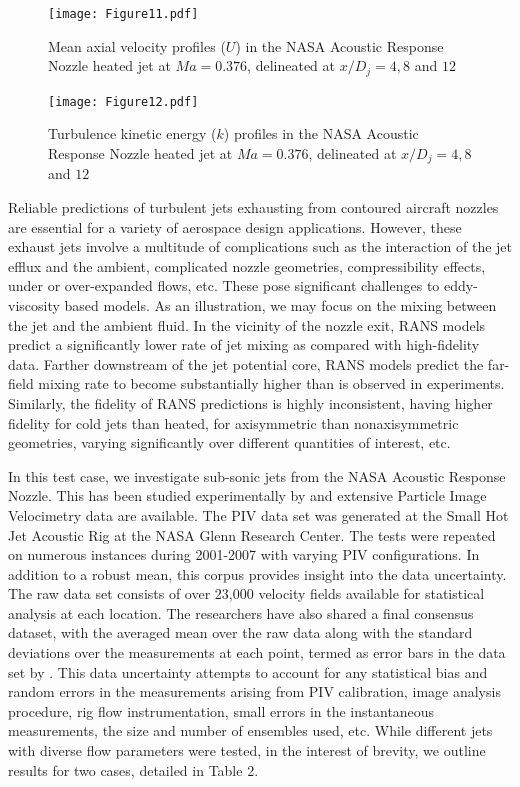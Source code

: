\begin{figure}
\texttt{[image: Figure11.pdf]}
\caption{Mean axial velocity profiles ($U$) in the NASA Acoustic Response Nozzle heated jet at $Ma=0.376$, delineated at $x/D_j= 4,8$ and $12$\label{fig:fig5a}}
\end{figure}


\begin{figure}
\texttt{[image: Figure12.pdf]}
\caption{Turbulence kinetic energy ($k$) profiles in the NASA Acoustic Response Nozzle heated jet at $Ma=0.376$, delineated at $x/D_j= 4,8$ and $12$\label{fig:fig5b}}
\end{figure}

Reliable predictions of turbulent jets exhausting from contoured aircraft nozzles are essential for a variety of aerospace design applications. However, these exhaust jets involve a multitude of complications such as the interaction of the jet efflux and the ambient, complicated nozzle geometries, compressibility effects, under or over-expanded flows, etc. These pose significant challenges to eddy-viscosity based models. As an illustration, we may focus on the mixing between the jet and the ambient fluid. In the vicinity of the nozzle exit, RANS models predict a significantly lower rate of jet mixing as compared with high-fidelity data. Farther downstream of the jet potential core, RANS models predict the far-field mixing rate to become substantially higher than is observed in experiments. Similarly, the fidelity of RANS predictions is highly inconsistent, having higher fidelity for cold jets than heated, for axisymmetric than nonaxisymmetric geometries, varying significantly over different quantities of interest, etc. 


In this test case, we investigate sub-sonic jets from the NASA Acoustic Response Nozzle. This has been studied experimentally by \cite{nasajet} and extensive Particle Image Velocimetry data are available. The PIV data set was generated at the Small Hot Jet Acoustic Rig at the NASA Glenn Research Center. The tests were repeated on numerous instances during 2001-2007 with varying PIV configurations. In addition to a robust mean, this corpus provides insight into the data uncertainty. The raw data set consists of over 23,000 velocity fields available for statistical analysis at each location. The researchers have also shared a final consensus dataset, with the averaged mean over the raw data along with the standard deviations over the measurements at each point, termed as error bars in the data set by \cite{nasajet}. This data uncertainty attempts to account for any statistical bias and random errors in the measurements arising from PIV calibration, image analysis procedure, rig flow instrumentation, small errors in the instantaneous measurements, the size and number of ensembles used, etc. While different jets with diverse flow parameters were tested, in the interest of brevity, we outline results for two cases, detailed in Table 2.


